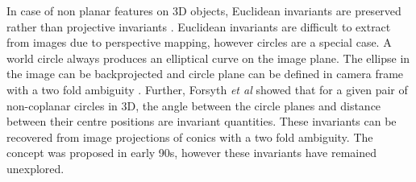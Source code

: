 \documentclass{bmvc2k}
\def\etal{\emph{et al}\bmvaOneDot}
\begin{document}
\par 
In case of non planar features on 3D objects, Euclidean invariants are preserved rather than projective invariants \cite{forsyth_91}.
Euclidean invariants are difficult to extract from images due to perspective mapping, however circles are a special case.   
A world circle always produces an elliptical curve on the image plane. 
The ellipse in the image can be backprojected and circle plane can be defined in camera frame with a two fold ambiguity \cite{forsyth_91,safaee-rad_three-dimensional_1992}. 
Further, Forsyth \etal \cite{forsyth_91} showed that for a given pair of non-coplanar circles in 3D, the angle between the circle planes and distance between their centre positions are invariant quantities.
These invariants can be recovered from image projections of conics with a two fold ambiguity. 
The concept was proposed in early 90s, however these invariants have remained unexplored.
\end{document}

